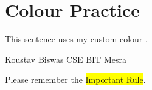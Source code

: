 \documentclass{article}
\begin{document}
	
	\section{Colour Practice}
	
	\textcolor{myblue}{This sentence uses my custom colour .}
	
	\textcolor{myblue}{\newline Koustav Biswas CSE BIT Mesra}
	
	Please remember the \colorbox{yellow}{Important Rule}.
\end{document}
